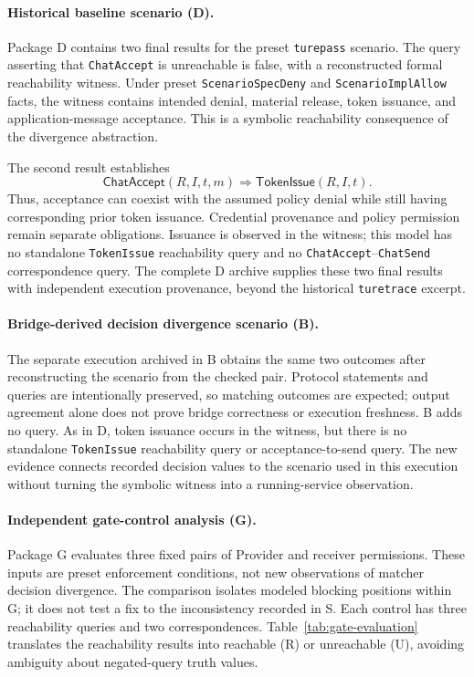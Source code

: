 \paragraph{Historical baseline scenario (D).}
Package D contains two final results for the preset \texttt{turepass} scenario.
The query asserting that \texttt{ChatAccept} is unreachable is false,
with a reconstructed formal reachability witness. Under preset
\texttt{ScenarioSpecDeny} and \texttt{ScenarioImplAllow} facts, the
witness contains intended denial, material release, token issuance, and
application-message acceptance. This is a symbolic reachability
consequence of the divergence abstraction.

The second result establishes
\[
\mathsf{ChatAccept}(R,I,t,m)\Rightarrow\mathsf{TokenIssue}(R,I,t).
\]
Thus, acceptance can coexist with the assumed policy denial while still
having corresponding prior token issuance. Credential provenance and
policy permission remain separate obligations. Issuance is observed in
the witness; this model has no standalone \texttt{TokenIssue} reachability
query and no \texttt{ChatAccept}--\texttt{ChatSend} correspondence query.
The complete D archive supplies these two final results with independent
execution provenance, beyond the historical \texttt{turetrace} excerpt.

\paragraph{Bridge-derived decision divergence scenario (B).}
The separate execution archived in B obtains the same two outcomes after
reconstructing the scenario from the checked pair. Protocol statements
and queries are intentionally preserved, so matching outcomes are expected;
output agreement alone does not prove bridge correctness or execution
freshness. B adds no query. As in D, token issuance occurs in the witness,
but there is no standalone \texttt{TokenIssue} reachability query or
acceptance-to-send query. The new evidence connects recorded decision values
to the scenario used in this execution without turning the symbolic witness
into a running-service observation.

\paragraph{Independent gate-control analysis (G).}
Package G evaluates three fixed pairs of Provider and receiver permissions.
These inputs are preset enforcement conditions, not new observations of
matcher decision divergence. The comparison isolates modeled blocking
positions within G; it does not test a fix to the inconsistency recorded in S.
Each control has three reachability queries and two correspondences.
Table~\ref{tab:gate-evaluation} translates the reachability results into
reachable (R) or unreachable (U), avoiding ambiguity about negated-query
truth values.

